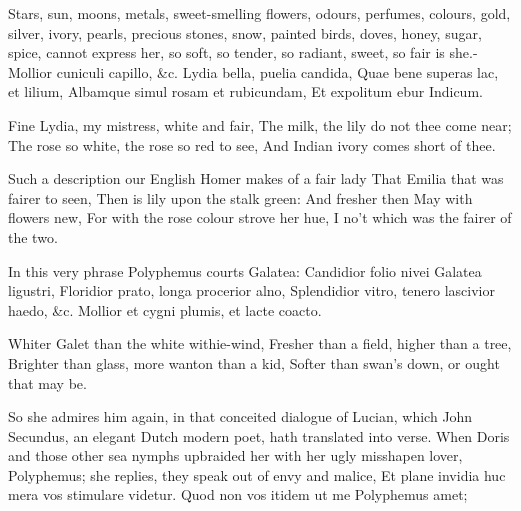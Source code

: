 {Stars, sun, moons, metals, sweet-smelling flowers, odours, perfumes,
colours, gold, silver, ivory, pearls, precious stones, snow, painted
birds, doves, honey, sugar, spice, cannot express her, so soft,
so tender, so radiant, sweet, so fair is she.-Mollior cuniculi capillo,
\&c.
Lydia bella, puelia candida,
Quae bene superas lac, et lilium,
Albamque simul rosam et rubicundam,
Et expolitum ebur Indicum.

Fine Lydia, my mistress, white and fair,
The milk, the lily do not thee come near;
The rose so white, the rose so red to see,
And Indian ivory comes short of thee.

Such a description our English Homer makes of a fair lady
That Emilia that was fairer to seen,
Then is lily upon the stalk green:
And fresher then May with flowers new,
For with the rose colour strove her hue,
I no't which was the fairer of the two.

In this very phrase Polyphemus courts Galatea:
Candidior folio nivei Galatea ligustri,
Floridior prato, longa procerior alno,
Splendidior vitro, tenero lascivior haedo, \&c.
Mollior et cygni plumis, et lacte coacto.

Whiter Galet than the white withie-wind,
Fresher than a field, higher than a tree,
Brighter than glass, more wanton than a kid,
Softer than swan's down, or ought that may be.

So she admires him again, in that conceited dialogue of Lucian, which
John Secundus, an elegant Dutch modern poet, hath translated into
verse. When Doris and those other sea nymphs upbraided her with her
ugly misshapen lover, Polyphemus; she replies, they speak out of envy
and malice,
Et plane invidia huc mera vos stimulare videtur.
Quod non vos itidem ut me Polyphemus amet;

}
